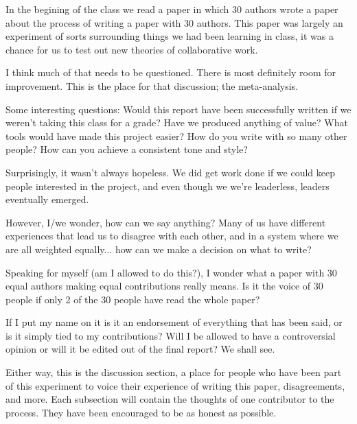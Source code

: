 In the begining of the class we read a paper \cite{tomlinson2012} in which 30 authors wrote a paper about the process of writing a paper with 30 authors. This paper was largely an experiment of sorts surrounding things we had been learning in class, it was a chance for us to test out new theories of collaborative work.

I think much of that needs to be questioned. There is most definitely room for improvement. This is the place for that discussion; the meta-analysis.

Some interesting questions:
Would this report have been successfully written if we weren't taking this class for a grade?
Have we produced anything of value?
What tools would have made this project easier? 
How do you write with so many other people? How can you achieve a consistent tone and style? 

Surprisingly, it wasn't always hopeless. We did get work done if we could keep people interested in the project, and even though we we're leaderless, leaders eventually emerged.  

However, I/we wonder, how can we say anything? Many of us have different experiences that lead 
us to disagree with each other, and in a system where we are all weighted equally... how can we make 
a decision on what to write?

Speaking for myself (am I allowed to do this?), I wonder what a paper with 30 equal authors making equal contributions really means. Is it the voice of 30 people if only 2 of the 30 people have read the whole paper?

If I put my name on it is it an endorsement of everything that has been said, or is it simply tied to my contributions? Will I be allowed to have a controversial opinion or will it be edited out of the final report? We shall see.

Either way, this is the discussion section, a place for people who have been part of this experiment to voice their experience of writing this paper, disagreements, and more. Each subsection will contain the thoughts of one contributor to the process. They have been encouraged to be as honest as possible.




